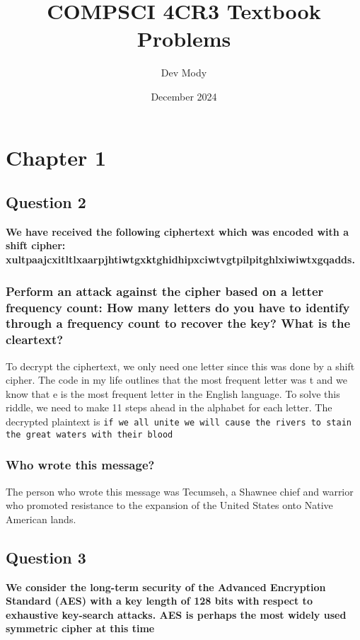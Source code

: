 \documentclass[titlepage]{article}
\title{\textbf{COMPSCI 4CR3 Textbook Problems}}
\author{Dev Mody}
\date{December 2024}
\begin{document}
\begin{titlepage}
\begin{titlingpage}
\maketitle
\end{titlingpage}
\end{titlepage}
\clearpage
\renewcommand{\baselinestretch}{1.5}\normalsize
\tableofcontents
\clearpage

\section{Chapter 1}
{
\subsection{Question 2}
{
\textbf{We have received the following ciphertext which was encoded with a shift cipher: xultpaajcxitltlxaarpjhtiwtgxktghidhipxciwtvgtpilpitghlxiwiwtxgqadds.}
\subsubsection{Perform an attack against the cipher based on a letter frequency count: How many letters do you have to identify through a frequency count to recover the key? What is the cleartext?}
{
To decrypt the ciphertext, we only need one letter since this was done by a shift cipher. The code in my life outlines that the most frequent letter was t and we know that e is the most frequent letter in the English language. To solve this riddle, we need to make 11 steps ahead in the alphabet for each letter. The decrypted plaintext is \texttt{if we all unite we will cause the rivers to stain the great waters with their blood}
}
\subsubsection{Who wrote this message?}
{
The person who wrote this message was Tecumseh, a Shawnee chief and warrior who promoted resistance to the expansion of the United States onto Native American lands.
}
}
\subsection{Question 3}
{
\textbf{We consider the long-term security of the Advanced Encryption Standard (AES) with a key length of 128 bits with respect to exhaustive key-search attacks. AES is perhaps the most widely used symmetric cipher at this time}
}}
\end{document}
